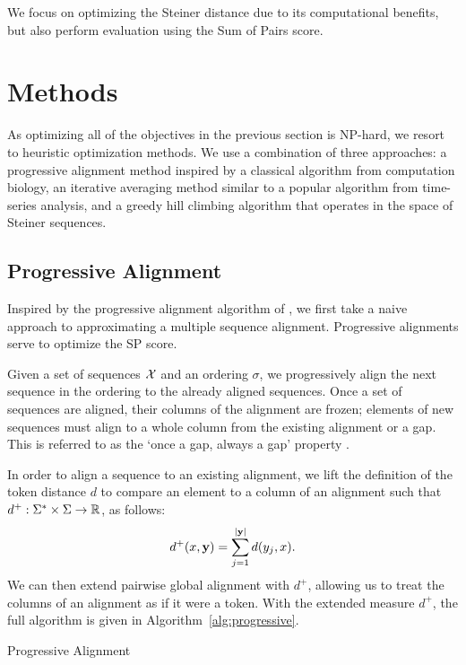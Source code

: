 \documentclass{article}
\begin{document}
We focus on optimizing the Steiner distance due to its computational
benefits, but also perform evaluation using the Sum of Pairs score.

\section{Methods}
As optimizing all of the objectives in the previous section is NP-hard,
we resort to heuristic optimization methods.
We use a combination of three approaches: a progressive alignment method
inspired by a classical algorithm from computation biology,
an iterative averaging method similar to a popular algorithm from time-series analysis,
and a greedy hill climbing algorithm that operates in the space of Steiner sequences.

\subsection{Progressive Alignment}
Inspired by the progressive alignment algorithm
of \citet{fengdoolittle}, we first take a naive approach to approximating
a multiple sequence alignment.
Progressive alignments serve to optimize the SP score.

Given a set of sequences $\mathcal{X}$ and an ordering $\sigma$,
we progressively align the next sequence in the ordering to the
already aligned sequences.
Once a set of sequences are aligned, their columns of the alignment are frozen;
elements of new sequences must align to a whole column
from the existing alignment or a gap.
This is referred to as the `once a gap, always a gap' property \citep{}.

In order to align a sequence to an existing alignment, we lift the definition of
the token distance $d$ to compare an element to a column of an alignment 
such that $d^+: \Sigma^*\times\Sigma\to\mathbb{R}$, as follows:
\begin{equation}
\label{eqn:dplus}
d^+(x, \mathbf{y}) = \sum_{j=1}^{|\mathbf{y}|} d(y_j, x).
\end{equation}
We can then extend pairwise global alignment with $d^+$, allowing us to
treat the columns of an alignment as if it were a token.
With the extended measure $d^+$, the full algorithm is given in Algorithm~\ref{alg:progressive}.

\begin{algorithm}[h]
\begin{algorithmic}
\EndFor
{}
\end{algorithmic}
\caption{\label{alg:progressive}
Progressive Alignment
}
\end{algorithm}
\end{document}
